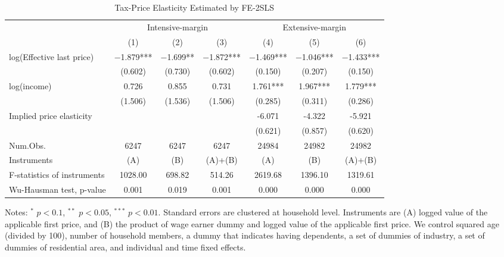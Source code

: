 \begin{table}

\caption{Tax-Price Elasticity Estimated by FE-2SLS \label{tab:fe2sls}}
\centering
\begin{threeparttable}
\begin{tabular}[t]{lcccccc}
\toprule
\multicolumn{1}{c}{ } & \multicolumn{3}{c}{Intensive-margin} & \multicolumn{3}{c}{Extensive-margin} \\
\cmidrule(l{3pt}r{3pt}){2-4} \cmidrule(l{3pt}r{3pt}){5-7}
  & (1) & (2) & (3) & (4) & (5) & (6)\\
\midrule
log(Effective last price) & \num{-1.879}*** & \num{-1.699}** & \num{-1.872}*** & \num{-1.469}*** & \num{-1.046}*** & \num{-1.433}***\\
 & (\num{0.602}) & (\num{0.730}) & (\num{0.602}) & (\num{0.150}) & (\num{0.207}) & (\num{0.150})\\
log(income) & \num{0.726} & \num{0.855} & \num{0.731} & \num{1.761}*** & \num{1.967}*** & \num{1.779}***\\
 & (\num{1.506}) & (\num{1.536}) & (\num{1.506}) & (\num{0.285}) & (\num{0.311}) & (\num{0.286})\\
\midrule
Implied price elasticity &  &  &  & -6.071 & -4.322 & -5.921\\
 &  &  &  & (0.621) & (0.857) & (0.620)\\
Num.Obs. & \num{6247} & \num{6247} & \num{6247} & \num{24984} & \num{24982} & \num{24982}\\
Instruments & (A) & (B) & (A)+(B) & (A) & (B) & (A)+(B)\\
F-statistics of instruments & 1028.00 & 698.82 & 514.26 & 2619.68 & 1396.10 & 1319.61\\
Wu-Hausman test, p-value & 0.001 & 0.019 & 0.001 & 0.000 & 0.000 & 0.000\\
\bottomrule
\end{tabular}
\begin{tablenotes}
\item Notes: $^{*}$ $p < 0.1$, $^{**}$ $p < 0.05$, $^{***}$ $p < 0.01$. Standard errors are clustered at household level. Instruments are (A) logged value of the applicable first price, and (B) the product of wage earner dummy and logged value of the applicable first price. We control squared age (divided by 100), number of household members, a dummy that indicates having dependents, a set of dummies of industry, a set of dummies of residential area, and individual and time fixed effects.
\end{tablenotes}
\end{threeparttable}
\end{table}
